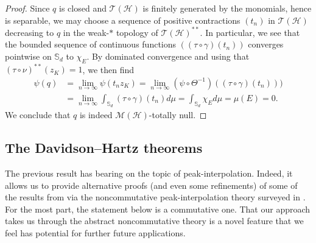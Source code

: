 \documentclass[10pt]{amsart}
\newcommand{\bS}{{\mathbb{S}}}
\renewcommand{\H}{{\mathcal{H}}}
\newcommand{\M}{{\mathcal{M}}}
\newcommand{\T}{{\mathcal{T}}}
\theoremstyle{definition}
\begin{document}
\begin{proof}
Since $q$ is closed and $\T(\H)$ is 
finitely generated by the monomials, hence is separable, we may choose  a sequence of positive contractions $(t_n)$ in $\T(\H)$ decreasing to $q$ in the weak-$*$ topology of $\T(\H)^{**}$. In particular, we see that the bounded sequence of continuous functions $((\tau\circ \gamma)(t_n))$ converges pointwise on $\bS_d$ to $\chi_E$. By dominated convergence and using that 
$(\tau \circ \nu)^{**}(z_K) = 1$, we then find
\begin{align*}
\psi (q)&=\lim_{n\to\infty} \psi(t_n z_K)=
\lim_{n\to\infty}(\psi \circ \Theta^{-1})( (\tau\circ \gamma)(t_n)))\\
&=\lim_{n\to\infty}\int_{\bS_d}(\tau\circ \gamma)(t_n)d\mu=\int_{\bS_d}\chi_E d\mu=\mu(E)=0.
\end{align*}
We conclude that $q$ is indeed $\M(\H)$-totally null.
\end{proof}



 

\subsection{The Davidson--Hartz theorems}
The previous result has bearing on the topic of peak-interpolation. Indeed, it allows us to provide alternative proofs (and even some refinements) of some of the results from \cite{DH2023} via the noncommutative peak-interpolation theory surveyed in \cite{blecher 2013}. For the most part, the statement below is a commutative one. That our approach takes us through the abstract noncommutative theory is a novel feature that we feel has potential for further future applications.  



% 
\end{document}
